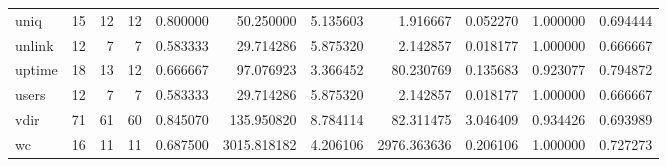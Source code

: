\begin{longtable}{lrrrrrrrrrr}
uniq      &                                      15 &                 12 &                                12 &                                   0.800000 &                              50.250000 &                                     5.135603 &                          1.916667 &                                0.052270 &                           1.000000 &                                           0.694444 \\
unlink    &                                      12 &                  7 &                                 7 &                                   0.583333 &                              29.714286 &                                     5.875320 &                          2.142857 &                                0.018177 &                           1.000000 &                                           0.666667 \\
uptime    &                                      18 &                 13 &                                12 &                                   0.666667 &                              97.076923 &                                     3.366452 &                         80.230769 &                                0.135683 &                           0.923077 &                                           0.794872 \\
users     &                                      12 &                  7 &                                 7 &                                   0.583333 &                              29.714286 &                                     5.875320 &                          2.142857 &                                0.018177 &                           1.000000 &                                           0.666667 \\
vdir      &                                      71 &                 61 &                                60 &                                   0.845070 &                             135.950820 &                                     8.784114 &                         82.311475 &                                3.046409 &                           0.934426 &                                           0.693989 \\
wc        &                                      16 &                 11 &                                11 &                                   0.687500 &                            3015.818182 &                                     4.206106 &                       2976.363636 &                                0.206106 &                           1.000000 &                                           0.727273 \\

\end{longtable}
